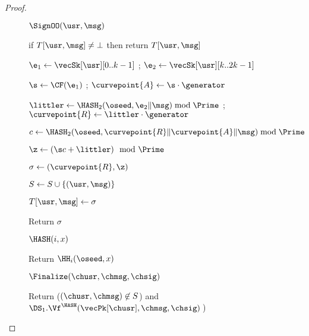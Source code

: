\begin{proof}
\begin{figure}
{			\begin{oracle}{$\SignOO(\usr, \msg)$}
				\item if $T[\usr, \msg] \neq \bot$ then return $T[\usr, \msg]$
				\item $\e_1 \gets \vecSk[\usr][0..k-1]$ ; $\e_2 \gets \vecSk[\usr][k..2k-1]$ 
				\item $\s \gets \CF(\e_1)$ ; $\curvepoint{A} \gets \s\cdot \generator$
				\item $\littler \gets \HASH_2(\oseed,\e_2\|\msg)\bmod \Prime$ 
				; $\curvepoint{R} \gets \littler\cdot \generator$
				\item $c \gets \HASH_2(\oseed, \curvepoint{R}\|\curvepoint{A}\|\msg) \bmod \Prime$
				\item $\z \gets (\s c + \littler) \mod \Prime$
				\item $\sigma \gets (\curvepoint{R},\z)$
				\item $S \gets S \cup \{(\usr, \msg)\}$
				\item $T[\usr, \msg] \gets \sigma$
				\item Return $\sigma$
			\end{oracle}
			\ExptSepSpace
			
			\begin{oracle}{$\HASH(i,x)$}
				\item Return $\HH_i(\oseed,x)$
			\end{oracle}
			\ExptSepSpace
			
			\begin{oracle}{$\Finalize(\chusr, \chmsg, \chsig)$}
				\item Return ($(\chusr,\chmsg) \not\in S$) and $\DS_1.\Vf^{\HASH}(\vecPk[\chusr], \chmsg, \chsig)\:$) \vspace{2pt}
			\end{oracle}
		}
		{
			
}
\end{figure}
\end{proof}
